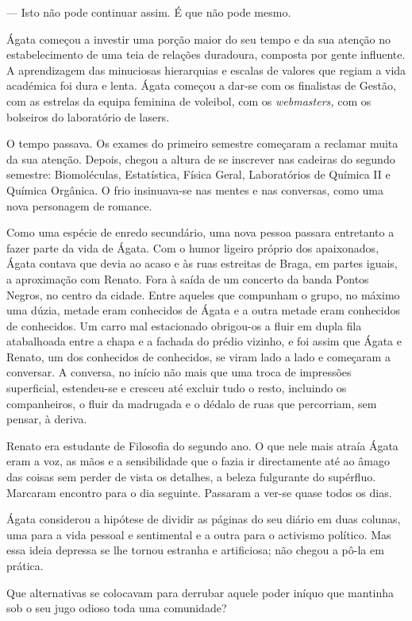 --- Isto não pode continuar assim. É que não pode mesmo.

Ágata começou a investir uma porção maior do seu tempo e da sua atenção
no estabelecimento de uma teia de relações duradoura, composta por gente
influente. A aprendizagem das minuciosas hierarquias e escalas de
valores que regiam a vida académica foi dura e lenta. Ágata começou a
dar-se com os finalistas de Gestão, com as estrelas da equipa feminina
de voleibol, com os \emph{webmasters, }com os bolseiros do laboratório
de lasers.

O tempo passava. Os exames do primeiro semestre começaram a reclamar
muita da sua atenção. Depois, chegou a altura de se inscrever nas
cadeiras do segundo semestre: Biomoléculas, Estatística, Física Geral,
Laboratórios de Química II e Química Orgânica. O frio insinuava-se nas
mentes e nas conversas, como uma nova personagem de romance.

Como uma espécie de enredo secundário, uma nova pessoa passara
entretanto a fazer parte da vida de Ágata. Com o humor ligeiro próprio
dos apaixonados, Ágata contava que
devia ao acaso e às ruas estreitas de Braga, em partes iguais, a
aproximação com Renato. Fora à saída de um concerto da banda Pontos
Negros, no centro da cidade. Entre aqueles que compunham o grupo, no
máximo uma dúzia, metade eram conhecidos de Ágata e a outra metade eram
conhecidos de conhecidos. Um carro mal estacionado obrigou-os a fluir em
dupla fila atabalhoada entre a chapa e a fachada do prédio vizinho, e
foi assim que Ágata e Renato, um dos conhecidos de conhecidos, se viram
lado a lado e começaram a conversar. A conversa, no início não mais que
uma troca de impressões superficial, estendeu-se e cresceu até excluir
tudo o resto, incluindo os companheiros, o fluir da madrugada e o
dédalo de ruas que percorriam, sem pensar, à deriva.

Renato era estudante de Filosofia do segundo ano. O que nele mais atraía
Ágata eram a voz, as mãos e a sensibilidade que o fazia ir directamente
até ao âmago das coisas sem perder de vista os detalhes, a beleza
fulgurante do supérfluo. Marcaram encontro para o dia seguinte.
Passaram a ver-se quase todos os dias.

Ágata considerou a hipótese de dividir as páginas do seu diário em duas
colunas, uma para a vida pessoal e sentimental e a outra para o
activismo político. Mas essa ideia depressa se lhe tornou estranha e
artificiosa; não chegou a pô-la em prática.

Que alternativas se colocavam para derrubar aquele poder iníquo que
mantinha sob o seu jugo odioso toda uma comunidade?

